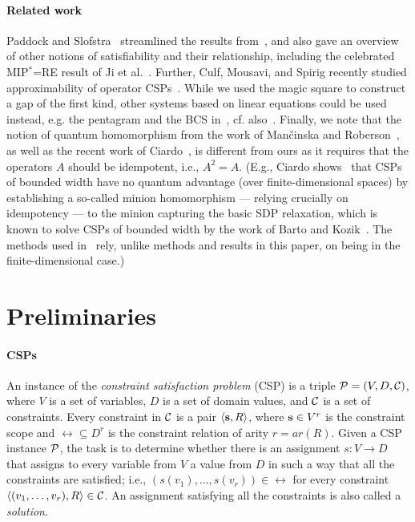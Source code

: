 \documentclass[11pt,letter]{article}
\begin{document}
\paragraph{Related work}
Paddock and Slofstra~\cite{Paddock23:arxiv} 
streamlined the results from~\cite{AKS19:jcss}, and also gave 
an overview of other notions of
satisfiability and their relationship, including the celebrated MIP$^*$=RE
result of Ji et al.~\cite{Ji20:arxiv,Ji22:cacm}.
Further, Culf, Mousavi, and Spirig recently studied approximability of operator
CSPs~\cite{Culf23:arxiv}.
While we used the magic square to construct a gap of the first kind, other
systems based on linear equations could be used instead, e.g. the pentagram and
the BCS in~\cite{Slofstra20:jams}, cf. also~\cite{Zhang24:arxiv}.
Finally, we note that the notion of quantum homomorphism from the work of Man\v{c}inska and
Roberson~\cite{Mancinska16:jctb}, as well as the recent work of
Ciardo~\cite{Ciardo24:lics},
is different from ours as it requires that the
operators $A$ should be idempotent, i.e., $A^2=A$.
(E.g., Ciardo shows~\cite{Ciardo24:lics} that CSPs of
bounded width have no quantum advantage (over finite-dimensional spaces) by establishing a so-called minion
homomorphism --- relying crucially on idempotency --- to the minion capturing the basic SDP relaxation, which is known
to solve CSPs of bounded width by the work of Barto and Kozik~\cite{Barto16:sicomp}. The methods used
in~\cite{Ciardo24:lics} rely, unlike methods and results in this paper, on being in the finite-dimensional case.)

 
\section{Preliminaries}\label{sec:preliminaries}



\paragraph{CSPs}
An instance of the \emph{constraint satisfaction problem} (CSP) is a triple
${\mathcal P}=(V,D,{\mathcal C})$, where $V$ is a set of variables, $D$ is a set of domain values,
and ${\mathcal C}$ is a set of constraints. Every constraint in ${\mathcal C}$ is a pair
$\langle {\bf s},R \rangle$, where ${\bf s}\in V^r$ is the constraint scope and $\rel\subseteq
D^r$ is the constraint relation of arity $r=ar(R)$. Given a CSP instance ${\mathcal P}$, the
task is to determine whether there is an assignment $s:V\to D$ that assigns to
every variable from $V$ a value from $D$ in such a way that
all the constraints are satisfied; i.e.,
$(s(v_1),\ldots,s(v_r))\in\rel$ for every constraint
$\langle (v_1,\ldots,v_r),R \rangle\in{\mathcal C}$. An assignment satisfying all the
constraints is also called a \emph{solution}.
\end{document}
